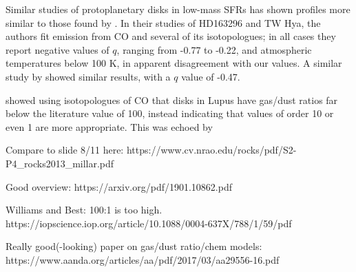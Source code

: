 


Similar studies of protoplanetary disks in low-mass SFRs has shown profiles more similar to those found by \cite{Factor2017}. In their studies of HD163296 and TW Hya\citep{Flaherty2015, Flaherty2018}, the authors fit emission from CO and several of its isotopologues; in all cases they report negative values of $q$, ranging from -0.77 to -0.22, and atmospheric temperatures below 100 K, in apparent disagreement with our values. A similar study by \citet{Zhang2017} showed similar results, with a $q$ value of -0.47.


\citet{Miotello2017} showed using isotopologues of CO that disks in Lupus have gas/dust ratios far below the literature value of 100, instead indicating that values of order 10 or even 1 are more appropriate. This was echoed by

Compare to slide 8/11 here:
https://www.cv.nrao.edu/rocks/pdf/S2-P4_rocks2013_millar.pdf


Good overview:
https://arxiv.org/pdf/1901.10862.pdf

Williams and Best: 100:1 is too high.
https://iopscience.iop.org/article/10.1088/0004-637X/788/1/59/pdf

Really good(-looking) paper on gas/dust ratio/chem models:
https://www.aanda.org/articles/aa/pdf/2017/03/aa29556-16.pdf




